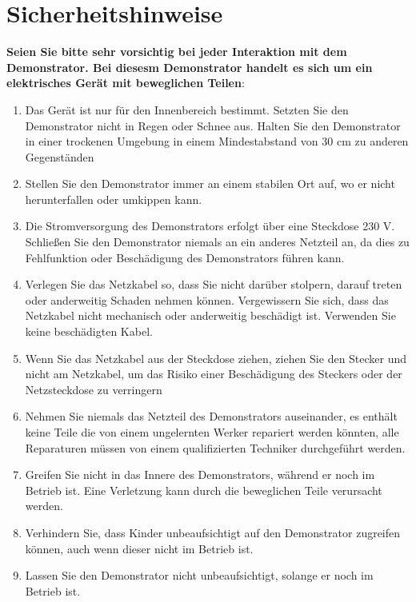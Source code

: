 %
%

\chapter{Sicherheitshinweise}


\textbf{Seien Sie bitte sehr vorsichtig bei jeder Interaktion mit dem Demonstrator. Bei diesesm Demonstrator handelt es sich um ein elektrisches Gerät mit beweglichen Teilen}:


	\begin{enumerate} \item Das Gerät ist nur für den Innenbereich bestimmt. Setzten Sie den Demonstrator nicht in Regen oder Schnee aus. Halten Sie den Demonstrator in einer trockenen Umgebung in einem Mindestabstand von 30 cm zu anderen Gegenständen
	
				\item Stellen Sie den Demonstrator immer an einem stabilen Ort auf, wo er nicht herunterfallen oder umkippen kann.	
			
			 	\item Die Stromversorgung des Demonstrators erfolgt über eine Steckdose 230 V. Schließen Sie den Demonstrator niemals an ein anderes Netzteil an, da dies zu Fehlfunktion oder Beschädigung des Demonstrators führen kann. 
				
				\item Verlegen Sie das Netzkabel so, dass Sie nicht darüber stolpern, darauf treten oder anderweitig Schaden nehmen können. Vergewissern Sie sich, dass das Netzkabel nicht mechanisch oder anderweitig beschädigt ist. Verwenden Sie keine beschädigten Kabel.
				 
				\item Wenn Sie das Netzkabel aus der Steckdose ziehen, ziehen Sie den Stecker und nicht am Netzkabel, um das Risiko einer Beschädigung des Steckers oder der Netzsteckdose zu verringern	
					
				\item Nehmen Sie niemals das Netzteil des Demonstrators auseinander, es enthält keine Teile die von einem ungelernten Werker repariert werden könnten, alle Reparaturen müssen von einem qualifizierten Techniker durchgeführt werden.
				
				\item Greifen Sie nicht in das Innere des Demonstrators, während er noch im Betrieb ist. Eine Verletzung kann durch die beweglichen Teile verursacht werden.
				
				\item Verhindern Sie, dass Kinder unbeaufsichtigt auf den Demonstrator zugreifen können, auch wenn dieser nicht im Betrieb ist. 
				
				\item Lassen Sie den Demonstrator nicht unbeaufsichtigt, solange er noch im Betrieb ist.
				
				
\end{enumerate}
